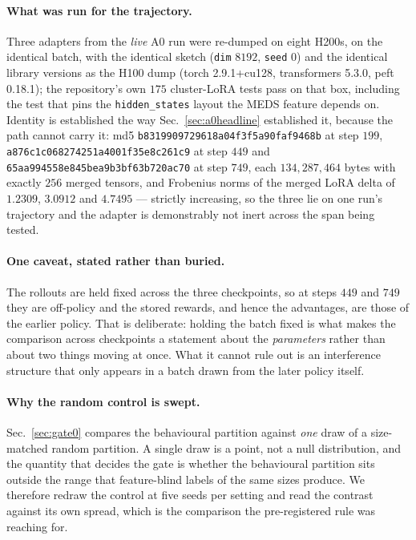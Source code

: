 \paragraph{What was run for the trajectory.} Three adapters from the \emph{live} A0 run were
re-dumped on eight H200s, on the identical batch, with the identical sketch (\texttt{dim}
$8192$, \texttt{seed} $0$) and the identical library versions as the H100 dump
(torch 2.9.1+cu128, transformers 5.3.0, peft 0.18.1); the repository's own $175$ cluster-LoRA
tests pass on that box, including the test that pins the \texttt{hidden\_states} layout the
MEDS feature depends on. Identity is established the way Sec.~\ref{sec:a0headline} established
it, because the path cannot carry it: md5 \texttt{b8319909729618a04f3f5a90faf9468b} at step
$199$, \texttt{a876c1c068274251a4001f35e8c261c9} at step $449$ and
\texttt{65aa994558e845bea9b3bf63b720ac70} at step $749$, each $134{,}287{,}464$ bytes with
exactly $256$ merged tensors, and Frobenius norms of the merged LoRA delta of $1.2309$,
$3.0912$ and $4.7495$ --- strictly increasing, so the three lie on one run's trajectory and the
adapter is demonstrably not inert across the span being tested.

\paragraph{One caveat, stated rather than buried.} The rollouts are held fixed across the three
checkpoints, so at steps $449$ and $749$ they are off-policy and the stored rewards, and hence
the advantages, are those of the earlier policy. That is deliberate: holding the batch fixed is
what makes the comparison across checkpoints a statement about the \emph{parameters} rather
than about two things moving at once. What it cannot rule out is an interference structure that
only appears in a batch drawn from the later policy itself.

\paragraph{Why the random control is swept.} Sec.~\ref{sec:gate0} compares the behavioural
partition against \emph{one} draw of a size-matched random partition. A single draw is a point,
not a null distribution, and the quantity that decides the gate is whether the behavioural
partition sits outside the range that feature-blind labels of the same sizes produce. We
therefore redraw the control at five seeds per setting and read the contrast against its own
spread, which is the comparison the pre-registered rule was reaching for.

